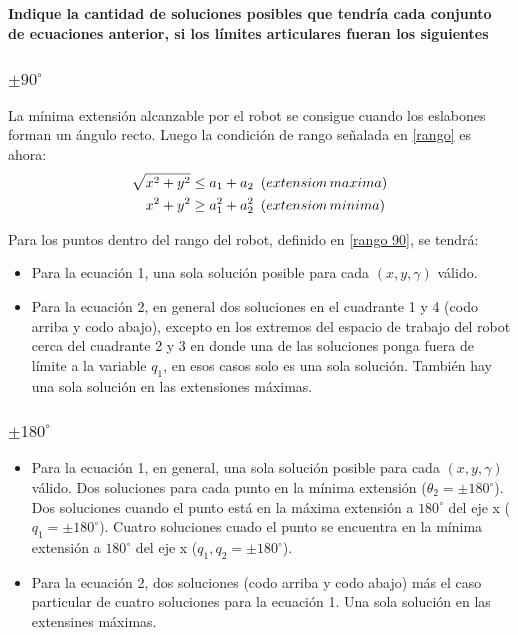 \documentclass[a4paper,12pt]{article}
\begin{document}
\subsection{}
\textbf{Indique la cantidad de soluciones posibles que tendría cada conjunto de ecuaciones anterior, si los límites articulares fueran los siguientes}
\subsubsection{$\pm 90^\circ$}
La mínima extensión alcanzable por el robot se consigue cuando los eslabones forman un ángulo recto. Luego la condición de rango señalada en \cref{rango} es ahora:
\begin{equation}
    \begin{aligned}
        \sqrt{x^2 + y^2}&\leq  a_1 + a_2\,\,\, \text(extension\,maxima)\\
        x^2 + y^2& \geq a_1^2 + a_2^2\,\,\, \text(extension\,minima)
    \end{aligned}
    \label{rango 90}
\end{equation}

Para los puntos dentro del rango del robot, definido en \cref{rango 90}, se tendrá:
\begin{itemize}
    \item Para la ecuación 1, una sola solución posible para cada $\left(x, y, \gamma\right)$ válido.
    \item Para la ecuación 2, en general dos soluciones en el cuadrante 1 y 4 (codo arriba y codo abajo), excepto en los extremos del espacio de trabajo del robot cerca del cuadrante 2 y 3 en donde una de las soluciones ponga fuera de límite a la variable $q_1$, en esos casos solo es una sola solución. También hay una sola solución en las extensiones máximas.
\end{itemize}

\subsubsection{$\pm 180^\circ$}

\begin{itemize}
    \item Para la ecuación 1, en general, una sola solución posible para cada $\left(x, y, \gamma\right)$ válido. Dos soluciones para cada punto en la mínima extensión ($\theta_2 = \pm 180^\circ$). Dos soluciones cuando el punto está en la máxima extensión a $180^\circ$ del eje x ($q_1 = \pm 180^\circ$). Cuatro soluciones cuado el punto se encuentra en la mínima extensión a $180^\circ$ del eje x ($q_1, q_2 = \pm 180^\circ$).
    \item Para la ecuación 2, dos soluciones (codo arriba y codo abajo) más el caso particular de cuatro soluciones para la ecuación 1. Una sola solución en las extensines máximas.
\end{itemize}
\end{document}

